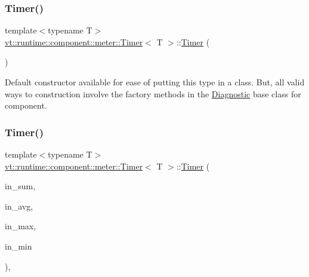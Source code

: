 \subsubsection{\texorpdfstring{Timer()}{Timer()}\hspace{0.1cm}{\footnotesize\ttfamily [1/2]}}
{\footnotesize\ttfamily template$<$typename T$>$ \\
\hyperlink{structvt_1_1runtime_1_1component_1_1meter_1_1_timer}{vt\+::runtime\+::component\+::meter\+::\+Timer}$<$ T $>$\+::\hyperlink{structvt_1_1runtime_1_1component_1_1meter_1_1_timer}{Timer} (\begin{DoxyParamCaption}{ }\end{DoxyParamCaption})\hspace{0.3cm}{\ttfamily [default]}}



Default constructor available for ease of putting this type in a class. But, all valid ways to construction involve the factory methods in the {\ttfamily \hyperlink{structvt_1_1runtime_1_1component_1_1_diagnostic}{Diagnostic}} base class for component. 

\mbox{\label{structvt_1_1runtime_1_1component_1_1meter_1_1_timer_afc814a211d7354cad6e64783e1f8fe8a}} 
\subsubsection{\texorpdfstring{Timer()}{Timer()}\hspace{0.1cm}{\footnotesize\ttfamily [2/2]}}
{\footnotesize\ttfamily template$<$typename T$>$ \\
\hyperlink{structvt_1_1runtime_1_1component_1_1meter_1_1_timer}{vt\+::runtime\+::component\+::meter\+::\+Timer}$<$ T $>$\+::\hyperlink{structvt_1_1runtime_1_1component_1_1meter_1_1_timer}{Timer} (\begin{DoxyParamCaption}\item[{\hyperlink{structvt_1_1runtime_1_1component_1_1detail_1_1_diagnostic_value}{detail\+::\+Diagnostic\+Value}$<$ T $>$ $\ast$}]{in\+\_\+sum,  }\item[{\hyperlink{structvt_1_1runtime_1_1component_1_1detail_1_1_diagnostic_value}{detail\+::\+Diagnostic\+Value}$<$ T $>$ $\ast$}]{in\+\_\+avg,  }\item[{\hyperlink{structvt_1_1runtime_1_1component_1_1detail_1_1_diagnostic_value}{detail\+::\+Diagnostic\+Value}$<$ T $>$ $\ast$}]{in\+\_\+max,  }\item[{\hyperlink{structvt_1_1runtime_1_1component_1_1detail_1_1_diagnostic_value}{detail\+::\+Diagnostic\+Value}$<$ T $>$ $\ast$}]{in\+\_\+min }\end{DoxyParamCaption})\hspace{0.3cm}{\ttfamily [inline]}, {\ttfamily [private]}}



